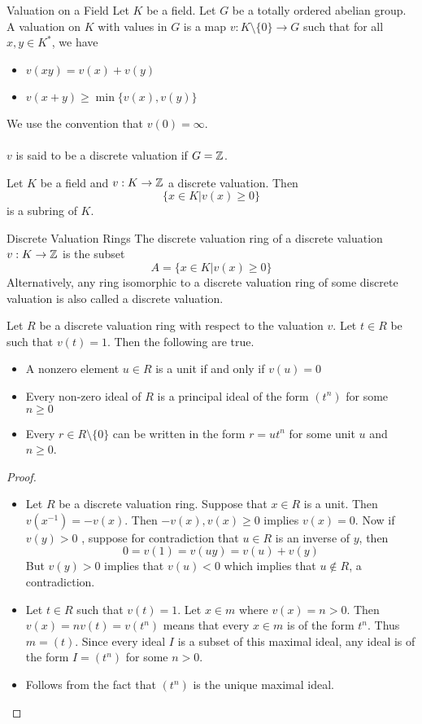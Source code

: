 \documentclass[a4paper]{article}
\begin{document}
\begin{defn}{Valuation on a Field}{} Let $K$ be a field. Let $G$ be a totally ordered abelian group. A valuation on $K$ with values in $G$ is a map $v:K\setminus\{0\}\to G$ such that for all $x,y\in K^\ast$, we have 
\begin{itemize}
\item $v(xy)=v(x)+v(y)$
\item $v(x+y)\geq\min\{v(x),v(y)\}$
\end{itemize}
We use the convention that $v(0)=\infty$. \\~\\
$v$ is said to be a discrete valuation if $G=\mathbb{Z}$. 
\end{defn}

\begin{prp}{}{} Let $K$ be a field and $v:K\to\mathbb{Z}$ a discrete valuation. Then $$\{x\in K|v(x)\geq 0\}$$ is a subring of $K$. 
\end{prp}

\begin{defn}{Discrete Valuation Rings}{} The discrete valuation ring of a discrete valuation $v:K\to\mathbb{Z}$ is the subset $$A=\{x\in K|v(x)\geq 0\}$$
Alternatively, any ring isomorphic to a discrete valuation ring of some discrete valuation is also called a discrete valuation. 
\end{defn}

\begin{prp}{}{} Let $R$ be a discrete valuation ring with respect to the valuation $v$. Let $t\in R$ be such that $v(t)=1$. Then the following are true. 
\begin{itemize}
\item A nonzero element $u\in R$ is a unit if and only if $v(u)=0$
\item Every non-zero ideal of $R$ is a principal ideal of the form $(t^n)$ for some $n\geq 0$
\item Every $r\in R\setminus\{0\}$ can be written in the form $r=ut^n$ for some unit $u$ and $n\geq 0$. 
\end{itemize}\tcbline
\begin{proof}~\\
\begin{itemize}
\item Let $R$ be a discrete valuation ring. Suppose that $x\in R$ is a unit. Then $v(x^{-1})=-v(x)$. Then $-v(x),v(x)\geq 0$ implies $v(x)=0$. Now if $v(y)>0$ , suppose for contradiction that $u\in R$ is an inverse of $y$, then $$0=v(1)=v(uy)=v(u)+v(y)$$ But $v(y)>0$ implies that $v(u)<0$ which implies that $u\notin R$, a contradiction. 
\item Let $t\in R$ such that $v(t)=1$. Let $x\in m$ where $v(x)=n>0$. Then $v(x)=nv(t)=v(t^n)$ means that every $x\in m$ is of the form $t^n$. Thus $m=(t)$. Since every ideal $I$ is a subset of this maximal ideal, any ideal is of the form $I=(t^n)$ for some $n>0$. 
\item Follows from the fact that $(t^n)$ is the unique maximal ideal. 
\end{itemize}
\end{proof}
\end{prp}
\end{document}
